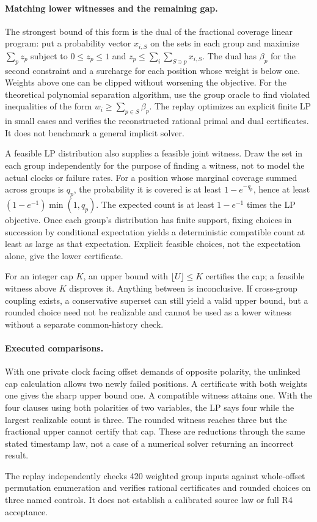 \documentclass[11pt]{article}
\begin{document}
\paragraph{Matching lower witnesses and the remaining gap.}
The strongest bound of this form is the dual of the fractional coverage
linear program: put a probability vector \(x_{i,S}\) on the sets in each
group and maximize \(\sum_p z_p\) subject to
\(0\le z_p\le1\) and
\(z_p\le \sum_i\sum_{S\ni p}x_{i,S}\).
The dual has \(\beta_p\) for the second constraint and a surcharge for
each position whose weight is below one. Weights above one can be
clipped without worsening the objective. For the theoretical
polynomial separation algorithm, use the group oracle to find violated
inequalities of the form \(w_i\ge \sum_{p\in S}\beta_p\). The replay
optimizes an explicit finite LP in small cases and verifies the
reconstructed rational primal and dual certificates. It does not
benchmark a general implicit solver.

A feasible LP distribution also supplies a feasible joint witness.
Draw the set in each group independently for the purpose of finding
a witness, not to model the actual clocks or failure rates. For a
position whose marginal coverage summed across groups is \(q_p\),
the probability it is covered is at least \(1-e^{-q_p}\), hence at
least \((1-e^{-1})\min(1,q_p)\). The expected count is at least
\(1-e^{-1}\) times the LP objective. Once each group's distribution
has finite support, fixing choices in succession by conditional
expectation yields a deterministic compatible count at least as large
as that expectation. Explicit feasible choices, not the expectation
alone, give the lower certificate.

For an integer cap \(K\), an upper bound with \(\lfloor U\rfloor\le K\)
certifies the cap; a feasible witness above \(K\) disproves it.
Anything between is inconclusive. If cross-group coupling exists,
a conservative superset can still yield a valid upper bound, but
a rounded choice need not be realizable and cannot be used as
a lower witness without a separate common-history check.

\paragraph{Executed comparisons.}
With one private clock facing offset demands of opposite polarity,
the unlinked cap calculation allows two newly failed positions.
A certificate with both weights one gives the sharp upper bound one.
A compatible witness attains one. With the four clauses using both
polarities of two variables, the LP says four while the largest
realizable count is three. The rounded witness reaches three but
the fractional upper cannot certify that cap. These are reductions
through the same stated timestamp law, not a case of a numerical
solver returning an incorrect result.

The replay independently checks 420 weighted group inputs against
whole-offset permutation enumeration and verifies rational
certificates and rounded choices on three named controls. It does
not establish a calibrated source law or full R4 acceptance.
\end{document}
